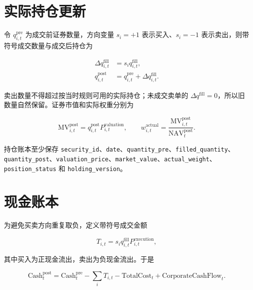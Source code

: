 \section{实际持仓更新}

令 \(q^{\mathrm{pre}}_{i,t}\) 为成交前证券数量，方向变量 \(s_i=+1\) 表示买入、\(s_i=-1\) 表示卖出，则带符号成交数量与成交后持仓为

\begin{align}
  \Delta q^{\mathrm{fill}}_{i,t}
  &=s_i q^{\mathrm{fill}}_{i,t},\\
  q^{\mathrm{post}}_{i,t}
  &=q^{\mathrm{pre}}_{i,t}+\Delta q^{\mathrm{fill}}_{i,t}.
  \label{eq:ch10-position-conservation}
\end{align}

卖出数量不得超过按当时规则可用的实际持仓；未成交卖单的 \(\Delta q^{\mathrm{fill}}=0\)，所以旧数量自然保留。证券市值和实际权重分别为

\begin{equation}
  \mathrm{MV}^{\mathrm{post}}_{i,t}
  =q^{\mathrm{post}}_{i,t}P^{\mathrm{valuation}}_{i,t},
  \qquad
  w^{\mathrm{actual}}_{i,t}
  =\frac{\mathrm{MV}^{\mathrm{post}}_{i,t}}
  {\mathrm{NAV}^{\mathrm{post}}_t}.
  \label{eq:ch10-actual-weight}
\end{equation}

持仓账本至少保存 \texttt{security\_id}、\texttt{date}、\texttt{quantity\_pre}、\texttt{filled\_quantity}、\texttt{quantity\_post}、\texttt{valuation\_price}、\texttt{market\_value}、\texttt{actual\_weight}、\texttt{position\_status} 和 \texttt{holding\_version}。

\section{现金账本}

为避免买卖方向重复取负，定义带符号成交金额

\begin{equation}
  T_{i,t}=s_i q^{\mathrm{fill}}_{i,t}P^{\mathrm{execution}}_{i,t},
  \label{eq:ch10-signed-trade-value}
\end{equation}

其中买入为正现金流出，卖出为负现金流出。于是

\begin{equation}
  \mathrm{Cash}^{\mathrm{post}}_t
  =\mathrm{Cash}^{\mathrm{pre}}_t
  -\sum_i T_{i,t}
  -\mathrm{TotalCost}_t
  +\mathrm{CorporateCashFlow}_t.
  \label{eq:ch10-cash-conservation}
\end{equation}

